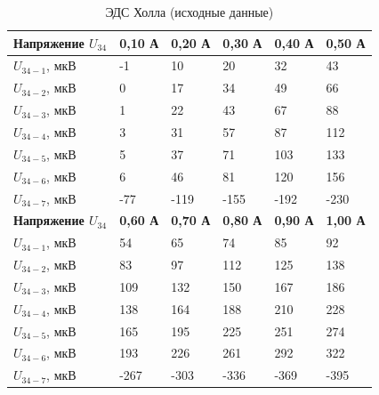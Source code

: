 \documentclass[a4paper, 12pt]{article}
\begin{document}
{\begin{table}[H]
\centering
\begin{tabular}{|l|l|l|l|l|l|}
\hline
\textbf{Напряжение $U_{34}$} & \textbf{0,10 А} & \textbf{0,20 А} & \textbf{0,30 А} & \textbf{0,40 А} & \textbf{0,50 А} \\ \hline
$U_{34-1}$, мкВ              & -1              & 10              & 20              & 32              & 43              \\ \hline
$U_{34-2}$, мкВ              & 0               & 17              & 34              & 49              & 66              \\ \hline
$U_{34-3}$, мкВ              & 1               & 22              & 43              & 67              & 88              \\ \hline
$U_{34-4}$, мкВ              & 3               & 31              & 57              & 87              & 112             \\ \hline
$U_{34-5}$, мкВ              & 5               & 37              & 71              & 103             & 133             \\ \hline
$U_{34-6}$, мкВ              & 6               & 46              & 81              & 120             & 156             \\ \hline
$U_{34-7}$, мкВ              & -77             & -119            & -155            & -192            & -230            \\ \hline
\textbf{Напряжение $U_{34}$} & \textbf{0,60 А} & \textbf{0,70 А} & \textbf{0,80 А} & \textbf{0,90 А} & \textbf{1,00 А} \\ \hline
$U_{34-1}$, мкВ              & 54              & 65              & 74              & 85              & 92              \\ \hline
$U_{34-2}$, мкВ              & 83              & 97              & 112             & 125             & 138             \\ \hline
$U_{34-3}$, мкВ              & 109             & 132             & 150             & 167             & 186             \\ \hline
$U_{34-4}$, мкВ              & 138             & 164             & 188             & 210             & 228             \\ \hline
$U_{34-5}$, мкВ              & 165             & 195             & 225             & 251             & 274             \\ \hline
$U_{34-6}$, мкВ              & 193             & 226             & 261             & 292             & 322             \\ \hline
$U_{34-7}$, мкВ              & -267            & -303            & -336            & -369            & -395            \\ \hline
\end{tabular}
\caption{ЭДС Холла (исходные данные)}
\label{my-label}
\end{table}




}
\end{document}
